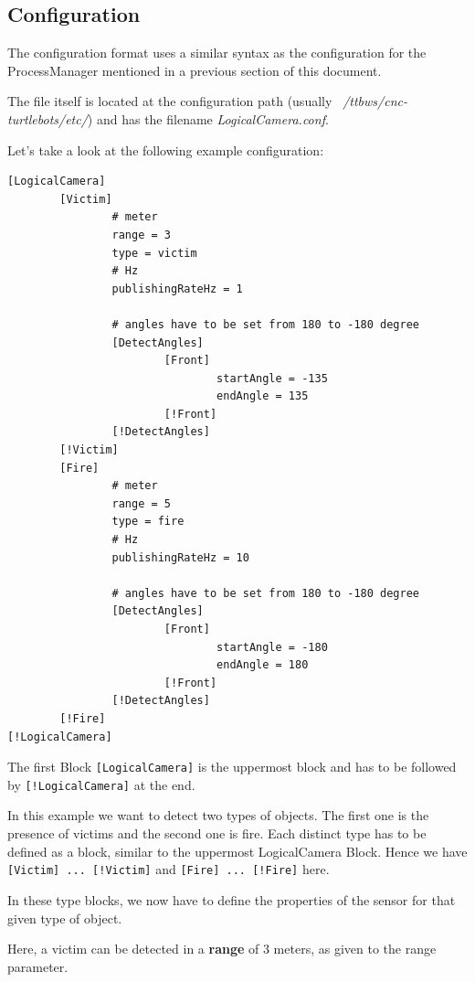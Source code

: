 \subsection{Configuration}

The configuration format uses a similar syntax as the configuration for the ProcessManager mentioned in a previous section of this document.

The file itself is located at the configuration path (usually \textit{~/ttbws/cnc-turtlebots/etc/}) and has the filename \textit{LogicalCamera.conf}.

Let's take a look at the following example configuration:

\begin{verbatim}
[LogicalCamera]
        [Victim]
                # meter
                range = 3
                type = victim
                # Hz
                publishingRateHz = 1

                # angles have to be set from 180 to -180 degree
                [DetectAngles]
                        [Front]
                                startAngle = -135
                                endAngle = 135
                        [!Front]
                [!DetectAngles]
        [!Victim]
        [Fire]
                # meter
                range = 5
                type = fire
                # Hz
                publishingRateHz = 10

                # angles have to be set from 180 to -180 degree
                [DetectAngles]
                        [Front]
                                startAngle = -180
                                endAngle = 180
                        [!Front]
                [!DetectAngles]
        [!Fire]
[!LogicalCamera]
\end{verbatim}

The first Block \texttt{[LogicalCamera]} is the uppermost block and has to be followed by \texttt{[!LogicalCamera]} at the end.

In this example we want to detect two types of objects. The first one is the presence of victims and the second one is fire. Each distinct type has to be defined as a block, similar to the uppermost LogicalCamera Block. Hence we have \texttt{[Victim] ... [!Victim]} and \texttt{[Fire] ... [!Fire]} here.

In these type blocks, we now have to define the properties of the sensor for that given type of object.

Here, a victim can be detected in a \textbf{range} of 3 meters, as given to  the range parameter.

